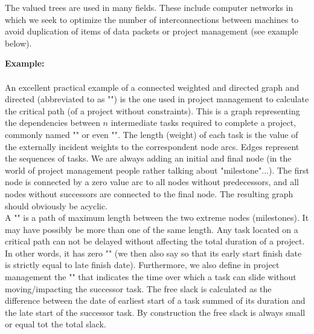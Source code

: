 {\begin{enumerate}
	\begin{tcolorbox}[title=Remark,colframe=black,arc=10pt]
	The valued trees are used in many fields. These include computer networks in which we seek to optimize the number of interconnections between machines to avoid duplication of items of data packets or project management (see example below).
	\end{tcolorbox}	
	\begin{tcolorbox}[colframe=black,colback=white,sharp corners]
	\textbf{{\Large {}}Example:}\\\\
		An excellent practical example of a connected weighted and directed graph and directed (abbreviated to as "") is the one used in project management to calculate the critical path (of a project without constraints). This is a graph representing the dependencies between $n$ intermediate tasks required to complete a project, commonly named "\label{gantt chart}" or even "". The length (weight) of each task is the value of the externally incident weights to the correspondent node arcs. Edges represent the sequences of tasks. We are always adding an initial and final node (in the world of project management people rather talking about "milestone"...). The first node is connected by a zero value arc to all nodes without predecessors, and all nodes without successors are connected to the final node. The resulting graph should obviously be acyclic.\\
		
		A "\label{critical path}" is a path of maximum length between the two extreme nodes (milestones). It may have possibly be more than one of the same length. Any task located on a critical path can not be delayed without affecting the total duration of a project. In other words, it has zero "" (we then also say so that its early start finish date is strictly equal to late finish date). Furthermore, we also define in project management the "" that indicates the time over which a task can slide without moving/impacting the successor task. The free slack is calculated as the difference between the date of earliest start of a task summed of its duration and the late start of the successor task. By construction the free slack is always small or equal tot the total slack.\\
		

\end{tcolorbox}
\end{enumerate}}
